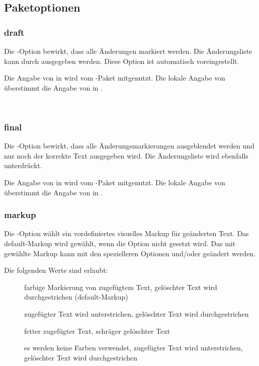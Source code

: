 \subsection{Paketoptionen}
\label{sec:user:options}

\subsubsection{draft}

Die -Option bewirkt, dass alle Änderungen markiert werden.
Die Änderungsliste kann durch  ausgegeben werden.
Diese Option ist automatisch voreingestellt.

Die Angabe von  in  wird vom -Paket mitgenutzt.
Die lokale Angabe von  überstimmt die Angabe von  in .

 \Corresponds\ 

\subsubsection{final}

Die -Option bewirkt, dass alle Änderungsmarkierungen ausgeblendet werden und nur noch der korrekte Text ausgegeben wird.
Die Änderungsliste wird ebenfalls unterdrückt.

Die Angabe von  in  wird vom -Paket mitgenutzt.
Die lokale Angabe von  überstimmt die Angabe von  in .


\subsubsection{markup}

Die -Option wählt ein vordefiniertes visuelles Markup für geänderten Text.
Das default-Markup wird gewählt, wenn die Option nicht gesetzt wird.
Das mit  gewählte Markup kann mit den spezielleren Optionen  und/oder  geändert werden.

Die folgenden Werte sind erlaubt:
\begin{description}
	\item [] farbige Markierung von zugefügtem Text, gelöschter Text wird durchgestrichen (default-Markup)
	\item [] zugefügter Text wird unterstrichen, gelöschter Text wird durchgestrichen
	\item [] fetter zugefügter Text, schräger gelöschter Text
	\item [] es werden keine Farben verwendet, zugefügter Text wird unterstrichen, gelöschter Text wird durchgestrichen
\end{description}

